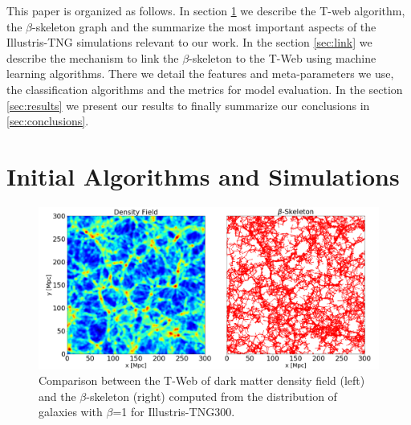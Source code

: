 \documentclass[usenatbib]{mnras}
\begin{document}
This paper is organized as follows. 
In section \ref{sec:init} we describe the T-web algorithm,
the $\beta$-skeleton graph and the summarize the most important
aspects of the Illustris-TNG simulations relevant to our work.
In the section \ref{sec:link} we
describe the mechanism to link the $\beta$-skeleton to the T-Web
using machine learning algorithms. 
There we detail the features and meta-parameters we use, the
classification algorithms and the metrics for model evaluation. 
In the section \ref{sec:results} we present our results
to finally summarize our conclusions in \ref{sec:conclusions}.


\section{Initial Algorithms and Simulations}\label{sec:init}

\begin{figure}
\centering
 \includegraphics[scale=0.33]{Figs/Fig1_.png}%
 \caption{Comparison between the T-Web of dark matter density field (left) and the $\beta$-skeleton (right) computed from the distribution of galaxies with $\beta$=1 for Illustris-TNG300.}
 \label{fig:TWebBsk}
\end{figure}
\end{document}
